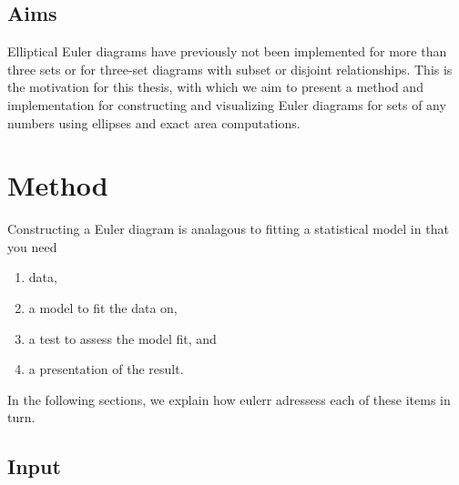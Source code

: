 \documentclass[
  oneside,
  openany,
  numbers=noendperiod,
  parskip=half,
  bibliography=totoc
]{scrbook}\usepackage[]{graphicx}\usepackage{xcolor}
\newcommand{\pkg}[1]{{\fontseries{b}\selectfont #1}}
\begin{document}
\section{Aims}
\label{sec:aims}

Elliptical Euler diagrams have previously not been implemented for more than
three sets or for three-set diagrams with subset or disjoint relationships. This
is the motivation for this thesis, with which we aim to present
a method and implementation for constructing and visualizing Euler diagrams for
sets of any numbers using ellipses and exact area computations.

\chapter{Method}
\label{ch:method}

Constructing a Euler diagram is analagous to fitting a statistical model in that
you need
\begin{enumerate}
\item data,
\item a model to fit the data on,
\item a test to assess the model fit, and
\item a presentation of the result.
\end{enumerate}
In the following sections, we explain how \pkg{eulerr} adressess each of these
items in turn.

\section{Input}
\label{sec:input}
\end{document}
